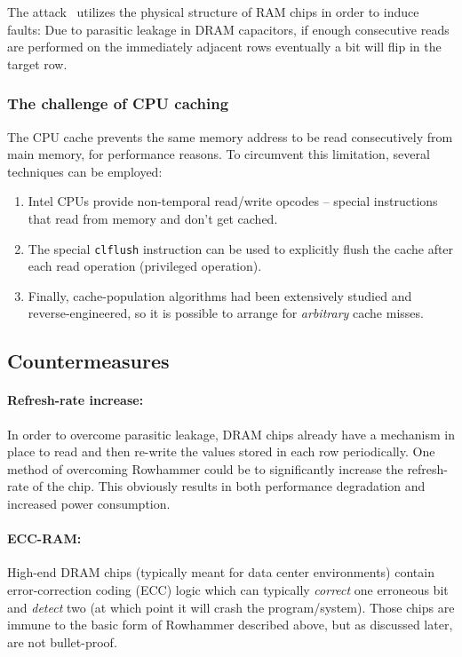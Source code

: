 The attack~\cite{rowhammer} utilizes the physical structure of RAM chips in order to induce faults: Due to parasitic leakage in DRAM capacitors, if enough consecutive reads are performed on the immediately adjacent rows eventually a bit will flip in the target row.

\subsubsection{The challenge of CPU caching}\label{subsubsec:the_challenge_of_cpu_caching}
The CPU cache prevents the same memory address to be read consecutively from main memory, for performance reasons.
To circumvent this limitation, several techniques can be employed:
\begin{enumerate}
	\item Intel CPUs provide non-temporal read/write opcodes -- special instructions that read from memory and don't get cached.
	\item The special \texttt{clflush} instruction can be used to explicitly flush the cache after each read operation (privileged operation).
	\item Finally, cache-population algorithms had been extensively studied and reverse-engineered, so it is possible to arrange for \emph{arbitrary} cache misses.
\end{enumerate}

\subsection{Countermeasures}\label{subsec:countermeasures}
\paragraph{Refresh-rate increase:} In order to overcome parasitic leakage, DRAM chips already have a mechanism in place to read and then re-write the values stored in each row periodically. One method of overcoming Rowhammer could be to significantly increase the refresh-rate of the chip. This obviously results in both performance degradation and increased power consumption.

\paragraph{ECC-RAM:} High-end DRAM chips (typically meant for data center environments) contain error-correction coding (ECC) logic which can typically \emph{correct} one erroneous bit and \emph{detect} two (at which point it will crash the program/system). Those chips are immune to the basic form of Rowhammer described above, but as discussed later, are not bullet-proof.

